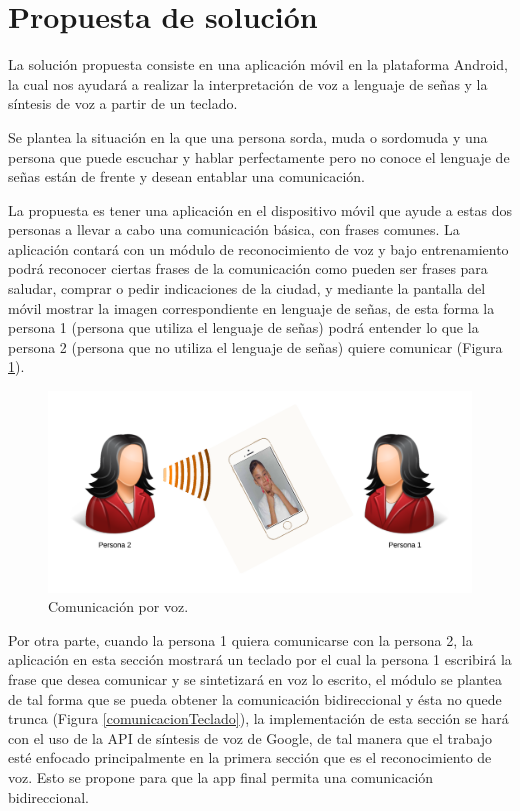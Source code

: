 
\section{Propuesta de solución}

	La solución propuesta consiste en una aplicación móvil en la plataforma Android, la cual nos ayudará a realizar la interpretación de voz a lenguaje de señas y la síntesis de voz a partir de un teclado.

	Se plantea la situación en la que una persona sorda, muda o sordomuda y una persona que puede escuchar y hablar perfectamente pero no conoce el lenguaje de señas están de frente y desean entablar una comunicación.

	La propuesta es tener una aplicación en el dispositivo móvil que ayude a estas dos personas a llevar a cabo una comunicación básica, con frases comunes. La aplicación contará con un módulo de reconocimiento de voz y bajo entrenamiento podrá reconocer ciertas frases de la comunicación como pueden ser frases para saludar, comprar o pedir indicaciones de la ciudad, y mediante la pantalla del móvil mostrar la imagen correspondiente en lenguaje de señas, de esta forma la persona 1 (persona que utiliza el lenguaje de señas) podrá entender lo que la persona 2 (persona que no utiliza el lenguaje de señas) quiere comunicar (Figura \ref{comunicacionVoz}).

	\begin{figure}[H]
		\centering
		\includegraphics[scale = 0.7]{figures/ComunicacionBA}
		\caption{Comunicación por voz.}
		\label{comunicacionVoz}
	\end{figure}

	Por otra parte, cuando la persona 1 quiera comunicarse con la persona 2, la aplicación en esta sección mostrará un teclado por el cual la persona 1 escribirá la frase que desea comunicar y se sintetizará en voz lo escrito, el módulo se plantea de tal forma que se pueda obtener la comunicación bidireccional y ésta no quede trunca (Figura \ref{comunicacionTeclado}), la implementación de esta sección se hará con el uso de la API de síntesis de voz de Google, de tal manera que el trabajo esté enfocado principalmente en la primera sección que es el reconocimiento de voz. Esto se propone para que la app final permita una comunicación bidireccional.

